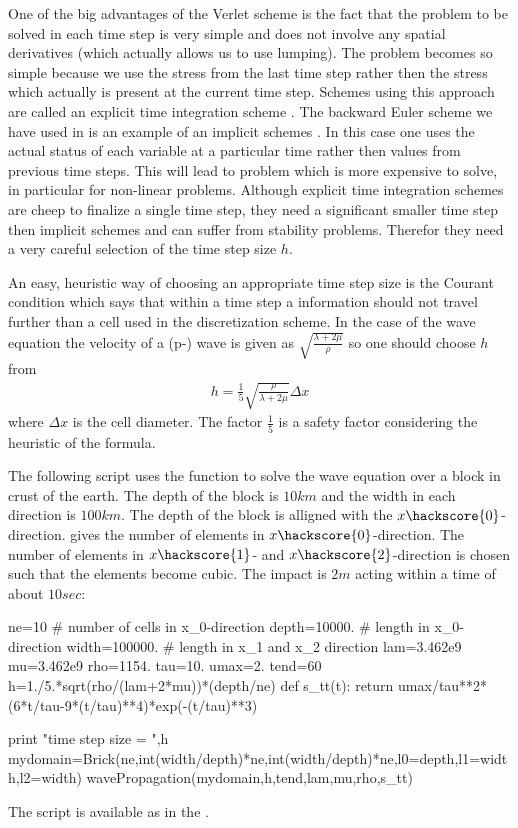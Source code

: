 One of the big advantages of the Verlet scheme is the fact that the problem to be solved 
in each time step is very simple and does not involve any spatial derivatives (which actually allows us to use lumping).
The problem becomes so simple because we use the stress from the last time step rather then the stress which 
actually is present at the current time step. Schemes using this approach are called an explicit time integration 
scheme  . The 
backward Euler scheme we have used in  is 
an example of an implicit schemes
 . In this case one uses the actual status of 
each variable at a particular time rather then values from previous time steps. This will lead to problem which is 
more expensive to solve, in particular for non-linear problems. 
Although 
explicit time integration schemes are cheep to finalize a single time step, they need a significant smaller time
step then implicit schemes and can suffer from stability problems. Therefor they need a 
very careful selection of the time step size $h$.

An easy, heuristic way of choosing an appropriate
time step size is the Courant condition  
which says that within a time step a information should not travel further than a cell used in the 
discretization scheme. In the case of the wave equation the velocity of a (p-) wave is given as
$\sqrt{\frac{\lambda+2\mu}{\rho}}$ so one should choose $h$ from
\begin{eqnarray}\label{WAVE dyn 66}
h= \frac{1}{5} \sqrt{\frac{\rho}{\lambda+2\mu}} \Delta x
\end{eqnarray}
where $\Delta x$ is the cell diameter. The factor $\frac{1}{5}$ is a safety factor considering the heuristic of 
the formula.

The following script uses the  function to solve the
wave equation over a block in crust of the earth. The depth of the block is 
$10km$ and the width in each direction is $100km$. The depth of the block is alligned
with the $x\hackscore{0}$-direction.  gives the number of elements in $x\hackscore{0}$-direction. The number 
of elements in $x\hackscore{1}$- and $x\hackscore{2}$-direction is chosen such that the elements 
become cubic. The impact is $2m$ acting within a time of about $10sec$:
\begin{python}
ne=10           # number of cells in x_0-direction
depth=10000.   # length in x_0-direction
width=100000.  # length in x_1 and x_2 direction
lam=3.462e9
mu=3.462e9
rho=1154.
tau=10.
umax=2.
tend=60
h=1./5.*sqrt(rho/(lam+2*mu))*(depth/ne)
def s_tt(t): return umax/tau**2*(6*t/tau-9*(t/tau)**4)*exp(-(t/tau)**3)

print "time step size = ",h
mydomain=Brick(ne,int(width/depth)*ne,int(width/depth)*ne,l0=depth,l1=width,l2=width)
wavePropagation(mydomain,h,tend,lam,mu,rho,s_tt)
\end{python}
The script is available as  in the \ExampleDirectory {}.


